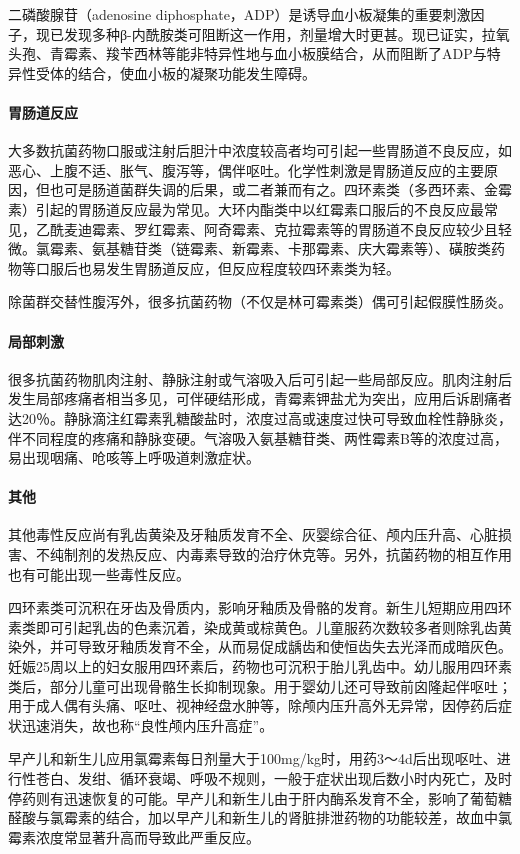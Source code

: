 二磷酸腺苷（adenosine
diphosphate，ADP）是诱导血小板凝集的重要刺激因子，现已发现多种β-内酰胺类可阻断这一作用，剂量增大时更甚。现已证实，拉氧头孢、青霉素、羧苄西林等能非特异性地与血小板膜结合，从而阻断了ADP与特异性受体的结合，使血小板的凝聚功能发生障碍。
\paragraph{胃肠道反应}

大多数抗菌药物口服或注射后胆汁中浓度较高者均可引起一些胃肠道不良反应，如恶心、上腹不适、胀气、腹泻等，偶伴呕吐。化学性刺激是胃肠道反应的主要原因，但也可是肠道菌群失调的后果，或二者兼而有之。四环素类（多西环素、金霉素）引起的胃肠道反应最为常见。大环内酯类中以红霉素口服后的不良反应最常见，乙酰麦迪霉素、罗红霉素、阿奇霉素、克拉霉素等的胃肠道不良反应较少且轻微。氯霉素、氨基糖苷类（链霉素、新霉素、卡那霉素、庆大霉素等）、磺胺类药物等口服后也易发生胃肠道反应，但反应程度较四环素类为轻。

除菌群交替性腹泻外，很多抗菌药物（不仅是林可霉素类）偶可引起假膜性肠炎。
\paragraph{局部刺激}

很多抗菌药物肌肉注射、静脉注射或气溶吸入后可引起一些局部反应。肌肉注射后发生局部疼痛者相当多见，可伴硬结形成，青霉素钾盐尤为突出，应用后诉剧痛者达20％。静脉滴注红霉素乳糖酸盐时，浓度过高或速度过快可导致血栓性静脉炎，伴不同程度的疼痛和静脉变硬。气溶吸入氨基糖苷类、两性霉素B等的浓度过高，易出现咽痛、呛咳等上呼吸道刺激症状。
\paragraph{其他}

其他毒性反应尚有乳齿黄染及牙釉质发育不全、灰婴综合征、颅内压升高、心脏损害、不纯制剂的发热反应、内毒素导致的治疗休克等。另外，抗菌药物的相互作用也有可能出现一些毒性反应。

四环素类可沉积在牙齿及骨质内，影响牙釉质及骨骼的发育。新生儿短期应用四环素类即可引起乳齿的色素沉着，染成黄或棕黄色。儿童服药次数较多者则除乳齿黄染外，并可导致牙釉质发育不全，从而易促成龋齿和使恒齿失去光泽而成暗灰色。妊娠25周以上的妇女服用四环素后，药物也可沉积于胎儿乳齿中。幼儿服用四环素类后，部分儿童可出现骨骼生长抑制现象。用于婴幼儿还可导致前囟隆起伴呕吐；用于成人偶有头痛、呕吐、视神经盘水肿等，除颅内压升高外无异常，因停药后症状迅速消失，故也称“良性颅内压升高症”。

早产儿和新生儿应用氯霉素每日剂量大于100mg/kg时，用药3～4d后出现呕吐、进行性苍白、发绀、循环衰竭、呼吸不规则，一般于症状出现后数小时内死亡，及时停药则有迅速恢复的可能。早产儿和新生儿由于肝内酶系发育不全，影响了葡萄糖醛酸与氯霉素的结合，加以早产儿和新生儿的肾脏排泄药物的功能较差，故血中氯霉素浓度常显著升高而导致此严重反应。

